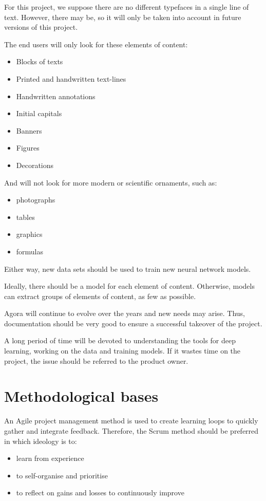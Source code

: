 \documentclass{polytech/polytech}
\numberwithin{figure}{chapter}
\begin{document}
For this project, we suppose there are no different typefaces in a single line of text.
However, there may be, so it will only be taken into account in future versions of this project.

The end users will only look for these elements of content:
\begin{itemize}
\item Blocks of texts
\item Printed and handwritten text-lines
\item Handwritten annotations
\item Initial capitals
\item Banners
\item Figures
\item Decorations
\end{itemize}

And will not look for more modern or scientific ornaments, such as:
\begin{itemize}
\item photographs
\item tables
\item graphics
\item formulas
\end{itemize}
Either way, new data sets should be used to train new neural network models.

Ideally, there should be a model for each element of content.
Otherwise, models can extract groups of elements of content, as few as possible.

Agora will continue to evolve over the years and new needs may arise.
Thus, documentation should be very good to ensure a successful takeover of the project.

A long period of time will be devoted to understanding the tools for deep learning, working on the data and training models.
If it wastes time on the project, the issue should be referred to the product owner.


\section{Methodological bases}

An Agile project management method is used to create learning loops to quickly gather and integrate feedback.
Therefore, the Scrum method should be preferred in which ideology is to:
\begin{itemize}
\item learn from experience
\item to self-organise and prioritise
\item to reflect on gains and losses to continuously improve
\end{itemize}
\end{document}
